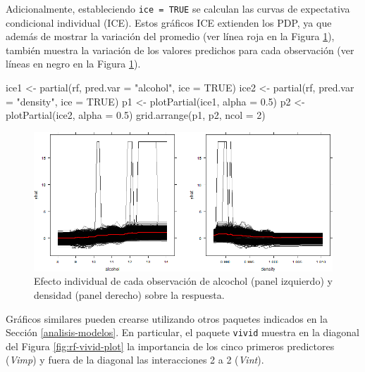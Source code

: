 \documentclass[
  spanish,
]{book}
\newenvironment{Shaded}{\begin{snugshade}}{\end{snugshade}}
\newcommand{\AttributeTok}[1]{\textcolor[rgb]{0.77,0.63,0.00}{#1}}
\newcommand{\ConstantTok}[1]{\textcolor[rgb]{0.00,0.00,0.00}{#1}}
\newcommand{\DecValTok}[1]{\textcolor[rgb]{0.00,0.00,0.81}{#1}}
\newcommand{\FloatTok}[1]{\textcolor[rgb]{0.00,0.00,0.81}{#1}}
\newcommand{\FunctionTok}[1]{\textcolor[rgb]{0.00,0.00,0.00}{#1}}
\newcommand{\NormalTok}[1]{#1}
\newcommand{\OtherTok}[1]{\textcolor[rgb]{0.56,0.35,0.01}{#1}}
\newcommand{\StringTok}[1]{\textcolor[rgb]{0.31,0.60,0.02}{#1}}
\theoremstyle{break}
\theoremstyle{definition}
\theoremstyle{definition}
\theoremstyle{definition}
\theoremstyle{definition}
\theoremstyle{remark}
\begin{document}
Adicionalmente, estableciendo \texttt{ice\ =\ TRUE} se calculan las curvas de expectativa condicional individual (ICE). Estos gráficos ICE extienden los PDP, ya que además de mostrar la variación del promedio (ver línea roja en la Figura \ref{fig:rf-ice-plot}), también muestra la variación de los valores predichos para cada observación (ver líneas en negro en la Figura \ref{fig:rf-ice-plot}).

\begin{Shaded}
\begin{Highlighting}[]
\NormalTok{ice1 }\OtherTok{\textless{}{-}} \FunctionTok{partial}\NormalTok{(rf, }\AttributeTok{pred.var =} \StringTok{"alcohol"}\NormalTok{, }\AttributeTok{ice =} \ConstantTok{TRUE}\NormalTok{)}
\NormalTok{ice2 }\OtherTok{\textless{}{-}} \FunctionTok{partial}\NormalTok{(rf, }\AttributeTok{pred.var =} \StringTok{"density"}\NormalTok{, }\AttributeTok{ice =} \ConstantTok{TRUE}\NormalTok{)}
\NormalTok{p1 }\OtherTok{\textless{}{-}} \FunctionTok{plotPartial}\NormalTok{(ice1, }\AttributeTok{alpha =} \FloatTok{0.5}\NormalTok{)}
\NormalTok{p2 }\OtherTok{\textless{}{-}} \FunctionTok{plotPartial}\NormalTok{(ice2, }\AttributeTok{alpha =} \FloatTok{0.5}\NormalTok{)}
\FunctionTok{grid.arrange}\NormalTok{(p1, p2, }\AttributeTok{ncol =} \DecValTok{2}\NormalTok{)}
\end{Highlighting}
\end{Shaded}

\begin{figure}[!htb]

{\centering \includegraphics[width=0.8\linewidth]{images/rf-ice-1} 

}

\caption{Efecto individual de cada observación de alcochol (panel izquierdo) y densidad (panel derecho) sobre la respuesta.}\label{fig:rf-ice-plot}
\end{figure}

Gráficos similares pueden crearse utilizando otros paquetes indicados en la Sección \ref{analisis-modelos}. En particular, el paquete \texttt{vivid} muestra en la diagonal del Figura \ref{fig:rf-vivid-plot} la importancia de los cinco primeros predictores (\emph{Vimp}) y fuera de la diagonal las interacciones 2 a 2 (\emph{Vint}).
\end{document}

